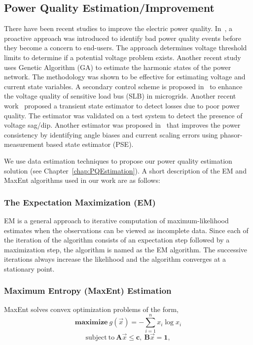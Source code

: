 \subsection{Power Quality Estimation/Improvement}
There have been recent studies to improve the electric power quality. In~\cite{mcbee2012utilizing}, a proactive approach was introduced to identify bad power quality events before they become a concern to end-users. The approach determines voltage threshold limits to determine if a potential voltage problem exists. Another recent study~\cite{almeida2013harmonic} uses Genetic Algorithm (GA) to estimate the harmonic states of the power network. The methodology was shown to be effective for estimating voltage and current state variables. A secondary control scheme is proposed in~\cite{savaghebi2012secondary} to enhance the voltage quality of sensitive load bus (SLB) in microgrids. Another recent work~\cite{farzanehrafat2013power} proposed a transient state estimator to detect losses due to poor power quality. The estimator was validated on a test system to detect the presence of voltage sag/dip. Another estimator was proposed in~\cite{ghiocel2014phasor} that improves the power consistency by identifying angle biases and current scaling errors using phasor-measurement based state estimator (PSE).

We use data estimation techniques to propose our power quality estimation solution (see Chapter~\ref{chap:PQEstimation}). A short description of the EM and MaxEnt algorithms used in our work are as follows:

\subsubsection{The Expectation Maximization (EM)} EM is a general approach to iterative computation of maximum-likelihood estimates when the observations can be viewed as incomplete data. Since each of the iteration of the algorithm consists of an expectation step followed by a maximization step, the algorithm is named as the EM algorithm. The successive iterations always increase the likelihood and the algorithm converges at a stationary point.

\subsubsection{Maximum Entropy (MaxEnt) Estimation} MaxEnt solves convex optimization problems of the form,
\[\mathrm{\mathbf{maximize}}~g(\vec{x}) = - \sum_{i=1}^n x_i \log x_i \]
\[\mathrm{subject~to~} \mathbf{A}\vec{x} \leq \mathbf{c},~ \mathbf{B}\vec{x} = \mathbf{1},\]

